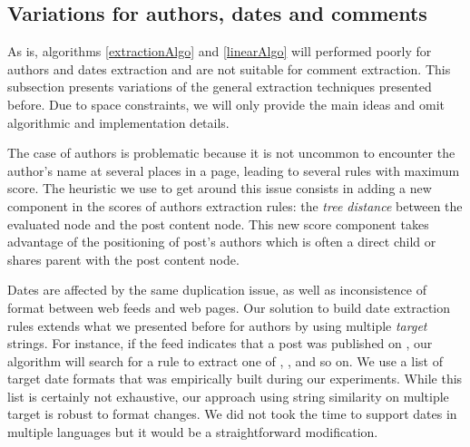 \subsection{Variations for authors, dates and comments}
As is, algorithms \ref{extractionAlgo} and \ref{linearAlgo} will performed poorly for authors and dates extraction and are not suitable for comment extraction. This subsection presents variations of the general extraction techniques presented before. Due to space constraints, we will only provide the main ideas and omit algorithmic and implementation details.

The case of authors is problematic because it is not uncommon to encounter the author's name at several places in a page, leading to several rules with maximum score. The heuristic we use to get around this issue consists in adding a new component in the scores of authors extraction rules: the \emph{tree distance} between the evaluated node and the post content node. This new score component takes advantage of the positioning of post's authors which is often a direct child or shares parent with the post content node.

Dates are affected by the same duplication issue, as well as inconsistence of format between web feeds and web pages. Our solution to build date extraction rules extends what we presented before for authors by using multiple \emph{target} strings. For instance, if the feed indicates that a post was published on
, our algorithm will search for a rule to extract one of , ,  and so on. We use a list of  target date formats that was empirically built during our experiments. While this list is certainly not exhaustive, our approach using string similarity on multiple target is robust to format changes. We did not took the time to support dates in multiple languages but it would be a straightforward modification.

